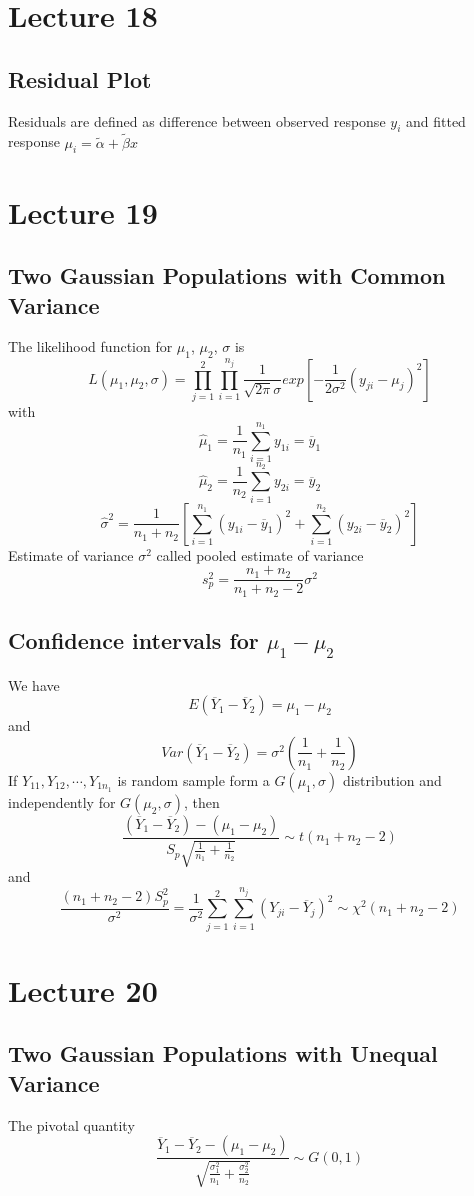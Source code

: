 \documentclass[11pt]{article}
\begin{document}
\section{Lecture 18}
\subsection{Residual Plot}
Residuals are defined as difference between observed response $y_i$ and fitted response $\mu_i=\tilde{\alpha}+\tilde{\beta}x$

\section{Lecture 19}
\subsection{Two Gaussian Populations with Common Variance}
The likelihood function for $\mu_1$, $\mu_2$, $\sigma$ is 
\[L(\mu_1,\mu_2,\sigma) = \prod_{j=1}^{2}\prod_{i=1}^{n_j}\frac{1}{\sqrt{2\pi}\sigma}exp[-\frac{1}{2\sigma^2}(y_{ji}-\mu_j)^2]\]
with 
\[\hat{\mu}_1 = \frac{1}{n_1}\sum_{i=1}^{n_1}y_{1i}=\overline{y}_1\]
\[\hat{\mu}_2 = \frac{1}{n_2}\sum_{i=1}^{n_2}y_{2i}=\overline{y}_2\]
\[\hat{\sigma}^2 = \frac{1}{n_1+n_2}[\sum_{i=1}^{n_1}(y_{1i}-\overline{y}_1)^2 + \sum_{i=1}^{n_2}(y_{2i}-\overline{y}_2)^2]\]
Estimate of variance $\sigma^2$ called pooled estimate of variance 
\[s^2_p = \frac{n_1+n_2}{n_1+n_2-2}\sigma^2\]
\subsection{Confidence intervals for $\mu_1-\mu_2$}
We have \[E(\overline{Y}_1 - \overline{Y}_2) = \mu_1 - \mu_2\]
and \[Var(\overline{Y}_1 - \overline{Y}_2) = \sigma^2(\frac{1}{n_1} + \frac{1}{n_2})\]
If $Y_{11},Y_{12},\cdots,Y_{1n_1}$ is random sample form a $G(\mu_1,\sigma)$ distribution and independently for $G(\mu_2,\sigma)$, then 
\[\frac{(\overline{Y}_1 - \overline{Y}_2) - (\mu_1-\mu_2)}{S_p\sqrt{\frac{1}{n_1}+\frac{1}{n_2}}}\sim t(n_1+n_2-2)\]
and 
\[\frac{(n_1+n_2-2)S_p^2}{\sigma^2} = \frac{1}{\sigma^2}\sum_{j=1}^{2}\sum_{i=1}^{n_j}(Y_{ji} - \overline{Y}_j)^2\sim \chi^2(n_1+n_2-2)\]

\section{Lecture 20}
\subsection{Two Gaussian Populations with Unequal Variance}
The pivotal quantity 
\[\frac{\overline{Y}_1 - \overline{Y}_2 - (\mu_1-\mu_2)}{\sqrt{\frac{\sigma_1^2}{n_1} + \frac{\sigma_2^2}{n_2}}}\sim G(0,1)\]
\end{document}
